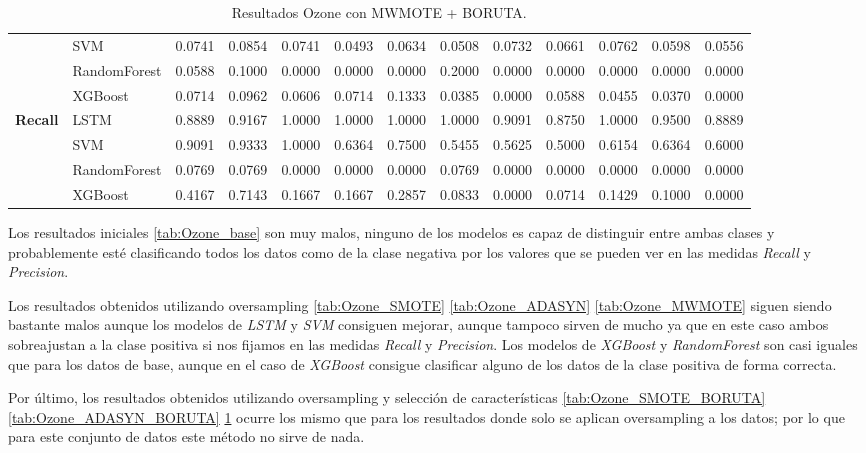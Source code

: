 \begin{table}[h]
\begin{adjustbox}{max width=15cm}
\begin{tabular}{|c|l|r|r|r|r|r|r|r|r|r|r|r|}
			& SVM &  0.0741 &  0.0854 &  0.0741 &  0.0493 &  0.0634 &  0.0508 &  0.0732 &  0.0661 &  0.0762 &  0.0598 &  0.0556 \\
			& RandomForest &  0.0588 &  0.1000 &  0.0000 &  0.0000 &  0.0000 &  0.2000 &  0.0000 &  0.0000 &  0.0000 &  0.0000 &  0.0000 \\
			& XGBoost &  0.0714 &  0.0962 &  0.0606 &  0.0714 &  0.1333 &  0.0385 &  0.0000 &  0.0588 &  0.0455 &  0.0370 &  0.0000 \\
			\hline
			\textbf{Recall} & LSTM &  0.8889 &  0.9167 &  1.0000 &  1.0000 &  1.0000 &  1.0000 &  0.9091 &  0.8750 &  1.0000 &  0.9500 &  0.8889 \\
			& SVM &  0.9091 &  0.9333 &  1.0000 &  0.6364 &  0.7500 &  0.5455 &  0.5625 &  0.5000 &  0.6154 &  0.6364 &  0.6000 \\
			& RandomForest &  0.0769 &  0.0769 &  0.0000 &  0.0000 &  0.0000 &  0.0769 &  0.0000 &  0.0000 &  0.0000 &  0.0000 &  0.0000 \\
			& XGBoost &  0.4167 &  0.7143 &  0.1667 &  0.1667 &  0.2857 &  0.0833 &  0.0000 &  0.0714 &  0.1429 &  0.1000 &  0.0000 \\
			\hline
		\end{tabular}
	\end{adjustbox}
	\caption{Resultados Ozone con MWMOTE + BORUTA.}
	\label{tab:Ozone_MWMOTE_BORUTA}
\end{table}
\newpage

Los resultados iniciales \ref{tab:Ozone_base} son muy malos, ninguno de los modelos es capaz de distinguir entre ambas clases y probablemente esté clasificando todos los datos como de la clase negativa por los valores que se pueden ver en las medidas \textit{Recall} y \textit{Precision}.\newline

Los resultados obtenidos utilizando oversampling \ref{tab:Ozone_SMOTE} \ref{tab:Ozone_ADASYN} \ref{tab:Ozone_MWMOTE} siguen siendo bastante malos aunque los modelos de \textit{LSTM} y \textit{SVM} consiguen mejorar, aunque tampoco sirven de mucho ya que en este caso ambos sobreajustan a la clase positiva si nos fijamos en las medidas \textit{Recall} y \textit{Precision}. Los modelos de \textit{XGBoost} y \textit{RandomForest} son casi iguales que para los datos de base, aunque en el caso de \textit{XGBoost} consigue clasificar alguno de los datos de la clase positiva de forma correcta.\newline

Por último, los resultados obtenidos utilizando oversampling y selección de características \ref{tab:Ozone_SMOTE_BORUTA} \ref{tab:Ozone_ADASYN_BORUTA} \ref{tab:Ozone_MWMOTE_BORUTA} ocurre los mismo que para los resultados donde solo se aplican oversampling a los datos; por lo que para este conjunto de datos este método no sirve de nada.\newline

